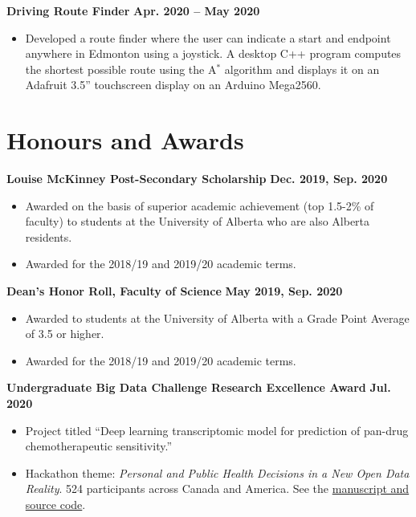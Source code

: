 \documentclass{article}
\begin{document}
\textbf{Driving Route Finder} \hfill \textbf{Apr. 2020 -- May 2020}
\begin{itemize}
    \item Developed a route finder where the user can indicate a start and endpoint anywhere in Edmonton using a joystick. A desktop C++ program computes the shortest possible route using the A$^*$ algorithm and displays it on an Adafruit 3.5'' touchscreen display on an Arduino Mega2560.
\end{itemize}


\section*{\textcolor{my_colour}{Honours and Awards}}
\vspace{-.25em} \hrulefill \vspace{.75em}

\textbf{Louise McKinney Post-Secondary Scholarship} \hfill \textbf{Dec. 2019, Sep. 2020}
\begin{itemize}
    \item Awarded on the basis of superior academic achievement (top 1.5-2\% of faculty) to students at the University of Alberta who are also Alberta residents.
    \item Awarded for the 2018/19 and 2019/20 academic terms.
\end{itemize}

\textbf{Dean's Honor Roll, Faculty of Science} \hfill \textbf{May 2019, Sep. 2020}
\begin{itemize}
    \item Awarded to students at the University of Alberta with a Grade Point Average of 3.5 or higher.
    \item Awarded for the 2018/19 and 2019/20 academic terms.
\end{itemize}

\textbf{Undergraduate Big Data Challenge Research Excellence Award} \hfill \textbf{Jul. 2020}
\begin{itemize}
    \item Project titled ``Deep learning transcriptomic model for prediction of pan-drug chemotherapeutic sensitivity.''
    \item Hackathon theme: \textit{Personal and Public Health Decisions in a New Open Data Reality}. 524 participants across Canada and America. See the \href{https://github.com/tig3r66/youreka_genes}{manuscript and source code}.
\end{itemize}
\end{document}

